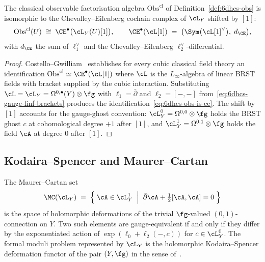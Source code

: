 \begin{proposition}
\label{prop:6dhcs-ce-dual}
The classical observable factorisation algebra
$\mathrm{Obs}^{\mathrm{cl}}$ of
Definition~\ref{def:6dhcs-obs} is isomorphic to the
Chevalley--Eilenberg cochain complex of $\cL_Y$ shifted by $[1]$:
\begin{equation}\label{eq:6dhcs-obs-is-ce}
 \mathrm{Obs}^{\mathrm{cl}}(U)
 \;\cong\;
 \CE^\bullet\bigl(\cL_Y(U)[1]\bigr),
 \qquad
 \CE^\bullet(\cL[1])
 \;=\;
 \bigl(\Sym\bigl(\cL[1]^\vee\bigr),\;d_{\CE}\bigr),
\end{equation}
with $d_{\CE}$ the sum of $\ell_1^\vee$ and the Chevalley--Eilenberg
$\ell_2^\vee$-differential.
\end{proposition}

\begin{proof}
Costello--Gwilliam~\cite[Ch.~4,\S4.2]{CostelloGwilliam2017}
establishes for every cubic classical field theory an identification
$\mathrm{Obs}^{\mathrm{cl}} \simeq \CE^\bullet(\cL[1])$ where $\cL$
is the $L_\infty$-algebra of linear BRST fields with bracket supplied
by the cubic interaction. Substituting
$\cL = \cL_Y = \Omega^{0,\bullet}(Y)\otimes\fg$ with
$\ell_1 = \bar\partial$ and $\ell_2 = [-,-]$
from~\eqref{eq:6dhcs-gauge-linf-brackets} produces the
identification~\eqref{eq:6dhcs-obs-is-ce}. The shift by $[1]$
accounts for the gauge-ghost convention: $\cL_Y^0 = \Omega^{0,0}
\otimes\fg$ holds the BRST ghost $c$ at cohomological degree $+1$
after $[1]$, and $\cL_Y^1 = \Omega^{0,1}\otimes\fg$ holds the field
$\cA$ at degree $0$ after $[1]$.
\end{proof}

\subsection{Kodaira--Spencer and Maurer--Cartan}
\label{subsec:vol2-bvbrst-6dhcs-ks}

\begin{theorem}
\label{thm:6dhcs-mc-is-ks}
The Maurer--Cartan set
\begin{equation}\label{eq:6dhcs-mc-set}
 \MC(\cL_Y)
 \;=\;
 \Bigl\{\;\cA\in\cL_Y^1 \;\Bigm|\;
 \bar\partial\cA + \tfrac12[\cA,\cA] = 0\;\Bigr\}
\end{equation}
is the space of holomorphic deformations of the trivial $\fg$-valued
$(0,1)$-connection on $Y$. Two such elements are gauge-equivalent if
and only if they differ by the exponentiated action of
$\exp(\ell_0 + \ell_2(-,c))$ for $c\in\cL_Y^0$. The formal moduli
problem represented by $\cL_Y$ is the holomorphic Kodaira--Spencer
deformation functor of the pair $(Y,\fg)$ in the sense
of~\cite{KodairaSpencer1958,Tian1987,Todorov1989}.
\end{theorem}

